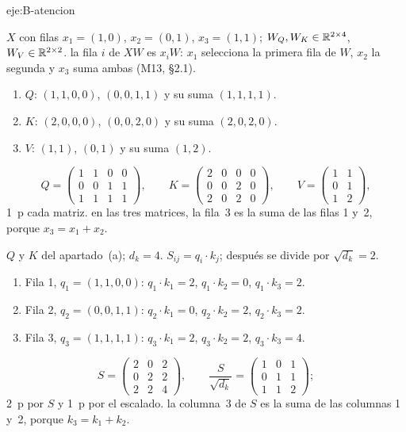\begin{solucion}{eje:B-atencion}

\datos $X$ con filas $x_1=(1,0)$, $x_2=(0,1)$, $x_3=(1,1)$; $W_Q,W_K\in\mathbb{R}^{2\times 4}$, $W_V\in\mathbb{R}^{2\times 2}$.
\planteamiento la fila $i$ de $XW$ es $x_iW$: $x_1$ selecciona la primera fila de $W$, $x_2$ la segunda y $x_3$ suma ambas (M13, §2.1).
\pasos
\begin{enumerate}[label=\arabic*.]
  \item $Q$: $(1,1,0,0)$, $(0,0,1,1)$ y su suma $(1,1,1,1)$.
  \item $K$: $(2,0,0,0)$, $(0,0,2,0)$ y su suma $(2,0,2,0)$.
  \item $V$: $(1,1)$, $(0,1)$ y su suma $(1,2)$.
\end{enumerate}
\resultado
\[
Q=\begin{pmatrix}1&1&0&0\\0&0&1&1\\1&1&1&1\end{pmatrix},\qquad
K=\begin{pmatrix}2&0&0&0\\0&0&2&0\\2&0&2&0\end{pmatrix},\qquad
V=\begin{pmatrix}1&1\\0&1\\1&2\end{pmatrix},
\]
1~p cada matriz.
\comprobacion en las tres matrices, la fila~3 es la suma de las filas 1 y~2, porque $x_3=x_1+x_2$.

\datos $Q$ y $K$ del apartado~(a); $d_k=4$.
\planteamiento $S_{ij}=q_i\cdot k_j$; después se divide por $\sqrt{d_k}=2$.
\pasos
\begin{enumerate}[label=\arabic*.]
  \item Fila 1, $q_1=(1,1,0,0)$: $q_1\cdot k_1=2$, $q_1\cdot k_2=0$, $q_1\cdot k_3=2$.
  \item Fila 2, $q_2=(0,0,1,1)$: $q_2\cdot k_1=0$, $q_2\cdot k_2=2$, $q_2\cdot k_3=2$.
  \item Fila 3, $q_3=(1,1,1,1)$: $q_3\cdot k_1=2$, $q_3\cdot k_2=2$, $q_3\cdot k_3=4$.
\end{enumerate}
\resultado
\[
S=\begin{pmatrix}2&0&2\\0&2&2\\2&2&4\end{pmatrix},\qquad
\frac{S}{\sqrt{d_k}}=\begin{pmatrix}1&0&1\\0&1&1\\1&1&2\end{pmatrix};
\]
2~p por $S$ y 1~p por el escalado.
\comprobacion la columna~3 de $S$ es la suma de las columnas 1 y~2, porque $k_3=k_1+k_2$.


\end{solucion}
